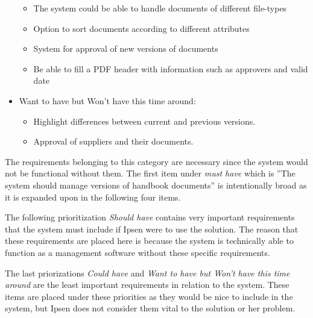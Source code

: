 \begin{itemize}
\begin{itemize}
            \item
            The system could be able to handle documents of different file-types
            \item
            Option to sort documents according to different attributes
            \item
            System for approval of new versions of documents
			\item
			Be able to fill a PDF header with information such as approvers and valid date
        \end{itemize}
    \item
    Want to have but Won't have this time around:
        \begin{itemize}
            \item
            Highlight differences between current and previous versions.
            \item
            Approval of suppliers and their documents.
        \end{itemize}
\end{itemize}

The requirements belonging to this category are necessary since the system would not be functional without them.
The first item under \textit{must have} which is ''The system should manage versions of handbook documents'' is intentionally broad as it is expanded upon in the following four items.

The following prioritization \textit{Should have} contains very important requirements that the system must include if Ipsen were to use the solution.
The reason that these requirements are placed here is because the system is technically able to function as a management software without these specific requirements.

The last priorizations \textit{Could have} and \textit{Want to have but Won't have this time around} are the least important requirements in relation to the system.
These items are placed under these priorities as they would be nice to include in the system, but Ipsen does not consider them vital to the solution or her problem.
